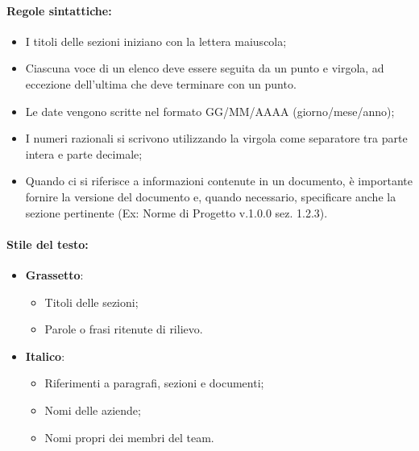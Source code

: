 \paragraph*{Regole sintattiche:}
\begin{itemize}
    \item I titoli delle sezioni iniziano con la lettera maiuscola;
    \item Ciascuna voce di un elenco deve essere seguita da un punto e virgola, ad eccezione dell'ultima che deve terminare con un punto.
    \item Le date vengono scritte nel formato GG/MM/AAAA (giorno/mese/anno);
    \item I numeri razionali si scrivono utilizzando la virgola come separatore tra parte intera e parte decimale;
    \item Quando ci si riferisce a informazioni contenute in un documento, è importante fornire la versione del documento e, quando necessario, specificare anche la sezione pertinente (Ex: Norme di Progetto v.1.0.0 sez. 1.2.3).
\end{itemize}

\paragraph*{Stile del testo:}
\begin{itemize}
    \item \textbf{Grassetto}:
    \begin{itemize}
        \item Titoli delle sezioni;
        \item Parole o frasi ritenute di rilievo.
    \end{itemize}
    \item \textbf{Italico}:
    \begin{itemize}
        \item Riferimenti a paragrafi, sezioni e documenti;
        \item Nomi delle aziende;
        \item Nomi propri dei membri del team.
    \end{itemize}
\end{itemize}

